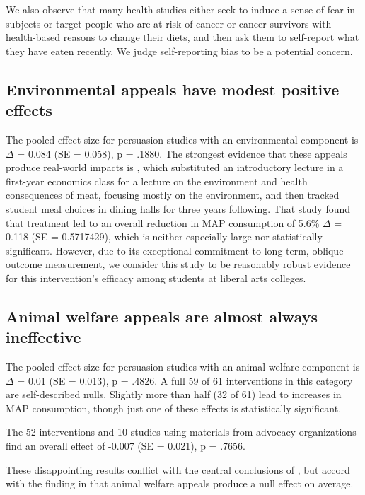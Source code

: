 \documentclass[sn-nature,pdflatex]{sn-jnl}
\begin{document}
We also observe that many health studies either seek to induce a sense
of fear in subjects \citep{berndsen2005} or target people who are at
risk of cancer \citep{hatami2018} or cancer survivors
\citep{james2015, lee2018} with health-based reasons to change their
diets, and then ask them to self-report what they have eaten recently.
We judge self-reporting bias to be a potential concern.

\subsection{Environmental appeals have modest positive
effects}\label{sec2.8}

The pooled effect size for persuasion studies with an environmental
component is \(\Delta\) = 0.084 (SE = 0.058), p = .1880. The strongest
evidence that these appeals produce real-world impacts is
\citep{jalil2023}, which substituted an introductory lecture in a
first-year economics class for a lecture on the environment and health
consequences of meat, focusing mostly on the environment, and then
tracked student meal choices in dining halls for three years following.
That study found that treatment led to an overall reduction in MAP
consumption of 5.6\% \(\Delta\) = 0.118 (SE = 0.5717429), which is
neither especially large nor statistically significant. However, due to
its exceptional commitment to long-term, oblique outcome measurement, we
consider this study to be reasonably robust evidence for this
intervention's efficacy among students at liberal arts colleges.

\subsection{Animal welfare appeals are almost always
ineffective}\label{sec2.9}

The pooled effect size for persuasion studies with an animal welfare
component is \(\Delta\) = 0.01 (SE = 0.013), p = .4826. A full 59 of 61
interventions in this category are self-described nulls. Slightly more
than half (32 of 61) lead to increases in MAP consumption, though just
one of these effects is statistically significant.

The 52 interventions and 10 studies using materials from advocacy
organizations find an overall effect of -0.007 (SE = 0.021), p = .7656.

These disappointing results conflict with the central conclusions of
\citep{mathur2021effectiveness}, but accord with the finding in
\citep{DiGennaro2024} that animal welfare appeals produce a null effect
on average.
\end{document}
